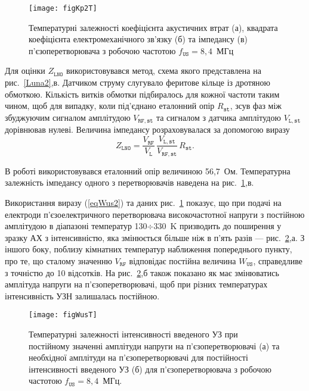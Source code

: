 \begin{figure}
\center
\texttt{[image: figKp2T]}%
\caption{\label{figKp2T}
Температурні залежності коефіцієнта акустичних втрат (а),
квадрата коефіцієнта електромеханічного зв'язку (б) та
імпедансу (в) п'єзоперетворювача з робочою частотою $f_\mathtt{US}=8,4$~МГц}
\end{figure}

Для оцінки $Z_\mathtt{LNO}$ використовувався метод,
схема якого представлена на рис.~\ref{Luna2},в.
Датчиком струму слугувало феритове кільце із дротяною обмоткою.
Кількість витків обмотки підбиралось для кожної частоти таким чином, щоб для випадку, коли під'єднано еталонний опір $R_\mathtt{st}$,
зсув фаз між збуджуючим сигналом амплітудою $V_\mathtt{RF,st}$ та сигналом з датчика амплітудою $V_\mathtt{L,st}$
дорівнював нулеві.
Величина імпедансу розраховувалася за допомогою виразу
 \begin{equation}
 \label{eqZlno}
 Z_\mathtt{LNO}=\frac{V_\mathtt{RF}}{V_\mathtt{L}}\,\frac{V_\mathtt{L,st}}{V_\mathtt{RF,st}}\,R_\mathtt{st}.
 \end{equation}

В роботі використовувався еталонний опір величиною 56,7~Ом.
Температурна залежність імпедансу одного з перетворювачів наведена на рис.~\ref{figKp2T},в.

Використання виразу (\ref{eqWus2}) та даних рис.~\ref{figKp2T} показує, що при подачі на електроди п'єзоелектричного перетворювача
високочастотної напруги з постійною амплітудою в діапазоні температур 130$\div$330~K призводить до поширення у зразку АХ з
інтенсивністю, яка змінюється більше ніж в п'ять разів --- рис.~\ref{figWusT},а.
З іншого боку, поблизу кімнатних температур наближення попереднього пункту, про те, що сталому значенню
$V_\mathtt{RF}$ відповідає постійна величина $ W_\mathtt{US}$, справедливе з точністю до 10 відсотків.
На рис.~\ref{figWusT},б також показано як має змінюватись амплітуда напруги на п'єзоперетворювачі, щоб при різних температурах
інтенсивність УЗН залишалась постійною.


\begin{figure}
\center
\texttt{[image: figWusT]}%
\caption{\label{figWusT}
Температурні залежності
інтенсивності введеного УЗ при постійному значенні амплітуди напруги на п'єзоперетворювачі (а)
та необхідної амплітуди на п'єзоперетворювачі для постійності інтенсивності введеного УЗ (б)
для п'єзоперетворювача з робочою частотою $f_\mathtt{US}=8,4$~МГц.
}
\end{figure}




